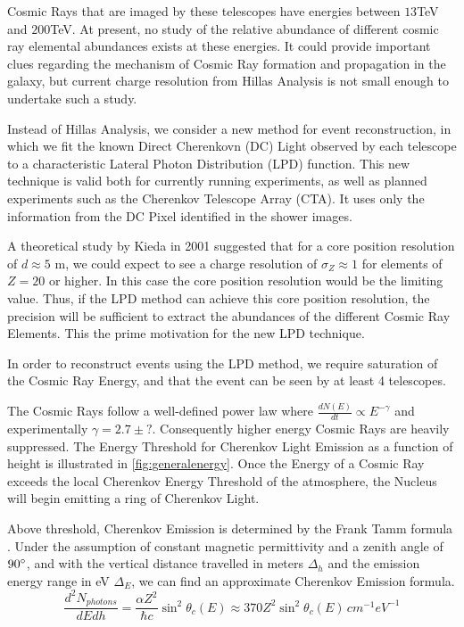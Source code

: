 \documentclass{article}
\begin{document}
Cosmic Rays that are imaged by these telescopes have energies between $13 $TeV and $200 $TeV. At present, no study of the relative abundance of different cosmic ray elemental abundances exists at these energies. It could provide important clues regarding the mechanism of Cosmic Ray formation and propagation in the galaxy, but current charge resolution from Hillas Analysis is not small enough to undertake such a study.

Instead of Hillas Analysis, we consider a new method for event reconstruction, in which we fit the known Direct Cherenkovn (DC) Light observed by each telescope to a characteristic Lateral Photon Distribution (LPD) function. This new technique is valid both for currently running experiments, as well as planned experiments such as the Cherenkov Telescope Array (CTA). It uses only the information from the DC Pixel identified in the shower images.

A theoretical study by Kieda in 2001 \cite{kieda01} suggested that for a core position resolution of $d \approx 5 $ m, we could expect to see a charge resolution of $ \sigma_{Z} \approx 1 $ for elements of $Z = 20$ or higher. In this case the core position resolution would be the limiting value. Thus, if the LPD method can achieve this core position resolution, the precision will be sufficient to extract the abundances of the different Cosmic Ray Elements. This the prime motivation for the new LPD technique.

In order to reconstruct events using the LPD method, we require saturation of the Cosmic Ray Energy, and that the event can be seen by at least 4 telescopes. 

The Cosmic Rays follow a well-defined power law where $ \frac{dN(E)}{dt} \propto E^{-\gamma} $ and experimentally $ \gamma = 2.7 \pm ? $. Consequently higher energy Cosmic Rays are heavily suppressed. The Energy Threshold for Cherenkov Light Emission as a function of height is illustrated in \ref{fig:generalenergy}. Once the Energy of a Cosmic Ray exceeds the local Cherenkov Energy Threshold of the atmosphere, the Nucleus will begin emitting a ring of Cherenkov Light. 

Above threshold, Cherenkov Emission is determined by the Frank Tamm formula \cite{ppreview}.  Under the assumption of constant magnetic permittivity and a zenith angle of $90\degree$, and with  the vertical distance travelled in meters $\Delta_{h}$ and the emission energy range in eV $\Delta_{E}$, we can find an approximate Cherenkov Emission formula.
\[ \frac{d^{2}N_{photons}}{dEdh} = \frac{\alpha Z^{2}}{\hbar c} \sin^{2} \theta_{c}(E) \approx 370 Z^{2} \sin^{2} \theta_{c}(E)\, cm^{-1}eV^{-1} \]
\end{document}
